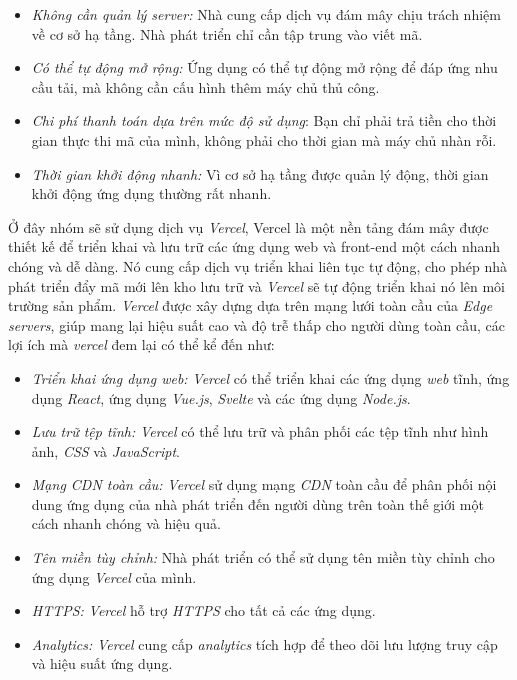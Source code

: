 \begin{itemize}
    \item \textit{Không cần quản lý server:} Nhà cung cấp dịch vụ đám mây chịu trách nhiệm về cơ sở hạ tầng. Nhà phát triển chỉ cần tập trung vào viết mã.
    \item \textit{Có thể tự động mở rộng:} Ứng dụng có thể tự động mở rộng để đáp ứng nhu cầu tải, mà không cần cấu hình thêm máy chủ thủ công.
    \item \textit{Chi phí thanh toán dựa trên mức độ sử dụng}: Bạn chỉ phải trả tiền cho thời gian thực thi mã của mình, không phải cho thời gian mà máy chủ nhàn rỗi.
    \item \textit{Thời gian khởi động nhanh:} Vì cơ sở hạ tầng được quản lý động, thời gian khởi động ứng dụng thường rất nhanh.
\end{itemize}
\hspace*{1cm}
Ở đây nhóm sẽ sử dụng dịch vụ \textit{Vercel}, Vercel là một nền tảng đám mây được thiết kế để triển khai và lưu trữ các ứng dụng web và front-end một cách nhanh chóng và dễ dàng. Nó cung cấp dịch vụ triển khai liên tục tự động, cho phép nhà phát triển đẩy mã mới lên kho lưu trữ và \textit{Vercel} sẽ tự động triển khai nó lên môi trường sản phẩm. \textit{Vercel} được xây dựng dựa trên mạng lưới toàn cầu của \textit{Edge servers}, giúp mang lại hiệu suất cao và độ trễ thấp cho người dùng toàn cầu, các lợi ích mà \textit{vercel} đem lại có thể kể đến như:
\begin{itemize}
    \item \textit{Triển khai ứng dụng web:} \textit{Vercel} có thể triển khai các ứng dụng \textit{web} tĩnh, ứng dụng \textit{React}, ứng dụng \textit{Vue.js}, \textit{Svelte} và các ứng dụng \textit{Node.js}.
    \item \textit{Lưu trữ tệp tĩnh:} \textit{Vercel} có thể lưu trữ và phân phối các tệp tĩnh như hình ảnh, \textit{CSS} và \textit{JavaScript}.
    \item \textit{Mạng CDN toàn cầu:} \textit{Vercel} sử dụng mạng \textit{CDN} toàn cầu để phân phối nội dung ứng dụng của nhà phát triển đến người dùng trên toàn thế giới một cách nhanh chóng và hiệu quả.
    \item \textit{Tên miền tùy chỉnh:} Nhà phát triển có thể sử dụng tên miền tùy chỉnh cho ứng dụng \textit{Vercel} của mình.
    \item \textit{HTTPS:} \textit{Vercel} hỗ trợ \textit{HTTPS} cho tất cả các ứng dụng.
    \item \textit{Analytics:} \textit{Vercel} cung cấp \textit{analytics} tích hợp để theo dõi lưu lượng truy cập và hiệu suất ứng dụng.
\end{itemize}
